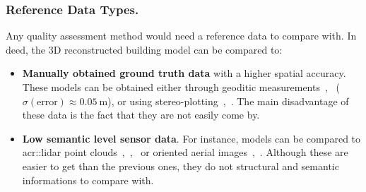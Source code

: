 \documentclass[runningheads]{llncs}
\begin{document}
\subsubsection{Reference Data Types.}
Any quality assessment method would need a reference data to compare with. In deed, the 3D reconstructed building model can be compared to:
\begin{itemize}
	\item \textbf{Manually obtained ground truth data} with a higher spatial accuracy. These models can be obtained either through geoditic measurements~\cite{Kaartinen2005},~\cite{Voegtle2003} ($\sigma(\text{error}) \approx \SI{0.05}{\meter}$), or using stereo-plotting~\cite{Kaartinen2005},~\cite{Zeng2014}. The main disadvantage of these data is the fact that they are not easily come by.
	\item \textbf{Low semantic level sensor data}. For instance, models can be compared to \acrfull{acr::lidar} point clouds~\cite{Akca2010},~\cite{Lafarge2012},~\cite{li2016boxfitting} or oriented aerial images~\cite{boudet2006supervised},~\cite{Michelin2013}. Although these are easier to get than the previous ones, they do not structural and semantic informations to compare with.
\end{itemize}
\end{document}
